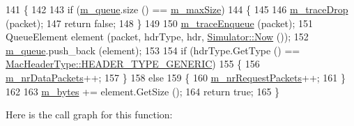 \begin{DoxyCode}
141 \{
142 
143   \textcolor{keywordflow}{if} (\hyperlink{classns3_1_1WimaxMacQueue_ad372c20acfe0acf6df6280662d63bdae}{m\_queue}.size () == \hyperlink{classns3_1_1WimaxMacQueue_aca04b5018ab36d96092f19467d381efd}{m\_maxSize})
144     \{
145 
146       \hyperlink{classns3_1_1WimaxMacQueue_af12e3058d4bac6a194db0fa730c2b81a}{m\_traceDrop} (packet);
147       \textcolor{keywordflow}{return} \textcolor{keyword}{false};
148     \}
149 
150   \hyperlink{classns3_1_1WimaxMacQueue_a4adff7167ee1ca8490d246560770ea20}{m\_traceEnqueue} (packet);
151   QueueElement element (packet, hdrType, hdr, \hyperlink{classns3_1_1Simulator_ac3178fa975b419f7875e7105be122800}{Simulator::Now} ());
152   \hyperlink{classns3_1_1WimaxMacQueue_ad372c20acfe0acf6df6280662d63bdae}{m\_queue}.push\_back (element);
153 
154   \textcolor{keywordflow}{if} (hdrType.GetType () == \hyperlink{classns3_1_1MacHeaderType_a54d8fc8bc93a2b7865627965cdd31c20a48fe5b2f20cadf78008c71469b518403}{MacHeaderType::HEADER\_TYPE\_GENERIC})
155     \{
156       \hyperlink{classns3_1_1WimaxMacQueue_ac47e05e3e877edf7d7a3d2b5d20d514a}{m\_nrDataPackets}++;
157     \}
158   \textcolor{keywordflow}{else}
159     \{
160       \hyperlink{classns3_1_1WimaxMacQueue_ad71c2599f50a2be15f7ce9abba5a539d}{m\_nrRequestPackets}++;
161     \}
162 
163   \hyperlink{classns3_1_1WimaxMacQueue_a79c3fd93dfef8c78b074c2aa6f2266ea}{m\_bytes} += element.GetSize ();
164   \textcolor{keywordflow}{return} \textcolor{keyword}{true};
165 \}
\end{DoxyCode}


Here is the call graph for this function\+:


